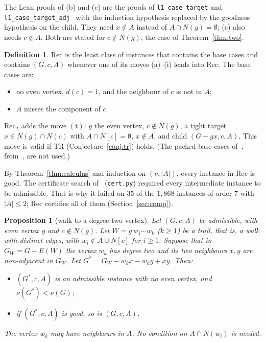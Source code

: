 \documentclass[11pt]{amsart}
\newtheorem{proposition}[theorem]{Proposition}
\theoremstyle{definition}
\newtheorem{definition}[theorem]{Definition}
\newcommand{\TR}{\mathrm{TR}}
\begin{document}
The Lean proofs of (b) and (c) are the proofs of \texttt{l1\_case\_target} and
\texttt{l1\_case\_target\_adj}~\cite{L1S} with the induction hypothesis replaced by the goodness
hypothesis on the child. They need $x\notin A$ instead of $A\cap N(g)=\emptyset$; (c) also needs
$c\notin A$. Both are stated for $c\notin N(g)$, the case of Theorem~\ref{thm:two}.

\begin{definition}\label{def:rec}
$\mathrm{Rec}$ is the least class of instances that contains the base cases and contains $(G,c,A)$
whenever one of its moves (a)--(i) leads into $\mathrm{Rec}$. The base cases are:
\begin{itemize}
\item no even vertex, $d(c)=1$, and the neighbour of $c$ is not in $A$;
\item $A$ misses the component of $c$.
\end{itemize}
$\mathrm{Rec}_T$ adds the move $(\mathrm t)$: $g$ the even vertex, $c\notin N(g)$, a tight target
$x\in N(g)\cap N(c)$ with $A\cap N[c]=\emptyset$, $x\notin A$, and child $(G-gx,c,A)$. This move is
valid if $\TR$ (Conjecture~\ref{conj:tr}) holds. (The packed base cases of~\cite[\S6]{L1S},
from~\cite[Theorems~6.1,~6.3]{RD}, are not used.)
\end{definition}

By Theorem~\ref{thm:calculus} and induction on $(\nu,|A|)$, every instance in $\mathrm{Rec}$ is
good. The certificate search of~\cite[\S6]{L1S} (\texttt{cert.py}) required every intermediate
instance to be admissible. That is why it failed on $35$ of the $1{,}868$ instances of order $7$ with
$|A|\le2$; $\mathrm{Rec}$ certifies all of them (Section~\ref{sec:comp}).

\begin{proposition}[walk to a degree-two vertex]\label{prop:walk2}
Let $(G,c,A)$ be admissible, with even vertex $g$ and $c\notin N(g)$. Let $W=g\,w_1\cdots w_k$
($k\ge1$) be a trail, that is, a walk with distinct edges, with $w_i\notin A\cup N[c]$ for $i\ge1$.
Suppose that in $G_W=G-E(W)$ the vertex $w_k$ has degree two and its two neighbours $x,y$ are
non-adjacent in $G_W$. Let $G^*=G_W-w_kx-w_ky+xy$. Then:
\begin{itemize}
\item $(G^*,c,A)$ is an admissible instance with no even vertex, and $\nu(G^*)<\nu(G)$;
\item if $(G^*,c,A)$ is good, so is $(G,c,A)$.
\end{itemize}
The vertex $w_k$ may have neighbours in $A$. No condition on $A\cap N(w_i)$ is needed.
\end{proposition}
\end{document}
